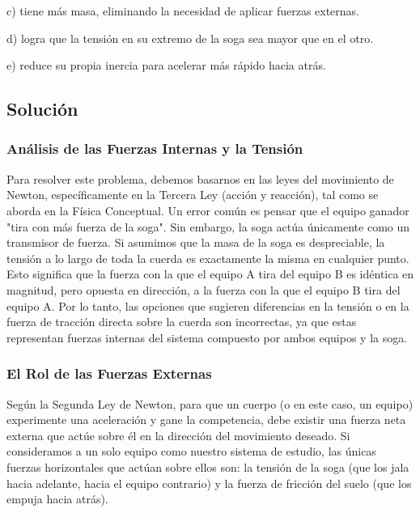 \documentclass[12pt]{article}
\begin{document}
c) tiene más masa, eliminando la necesidad de aplicar fuerzas externas.

d) logra que la tensión en su extremo de la soga sea mayor que en el otro.

e) reduce su propia inercia para acelerar más rápido hacia atrás.

\subsection*{Solución}

\subsubsection*{Análisis de las Fuerzas Internas y la Tensión}
Para resolver este problema, debemos basarnos en las leyes del movimiento de Newton, específicamente en la Tercera Ley (acción y reacción), tal como se aborda en la Física Conceptual. Un error común es pensar que el equipo ganador "tira con más fuerza de la soga". Sin embargo, la soga actúa únicamente como un transmisor de fuerza. Si asumimos que la masa de la soga es despreciable, la tensión a lo largo de toda la cuerda es exactamente la misma en cualquier punto. Esto significa que la fuerza con la que el equipo A tira del equipo B es idéntica en magnitud, pero opuesta en dirección, a la fuerza con la que el equipo B tira del equipo A. Por lo tanto, las opciones que sugieren diferencias en la tensión o en la fuerza de tracción directa sobre la cuerda son incorrectas, ya que estas representan fuerzas internas del sistema compuesto por ambos equipos y la soga.

\subsubsection*{El Rol de las Fuerzas Externas}
Según la Segunda Ley de Newton, para que un cuerpo (o en este caso, un equipo) experimente una aceleración y gane la competencia, debe existir una fuerza neta externa que actúe sobre él en la dirección del movimiento deseado. Si consideramos a un solo equipo como nuestro sistema de estudio, las únicas fuerzas horizontales que actúan sobre ellos son: la tensión de la soga (que los jala hacia adelante, hacia el equipo contrario) y la fuerza de fricción del suelo (que los empuja hacia atrás). 
\end{document}
